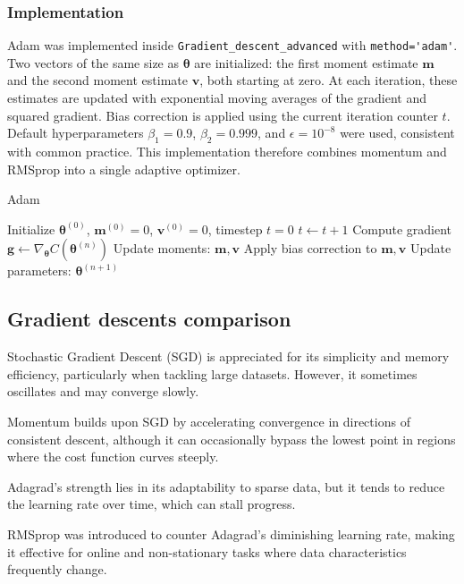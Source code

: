 \documentclass[
 reprint,            %
 amsmath,amssymb,
 aps,
]{revtex4-2}
\begin{document}
\subsubsection{Implementation}

Adam was implemented inside \verb|Gradient_descent_advanced| with \verb|method='adam'|. Two vectors of the same size as $\boldsymbol{\theta}$ are initialized: the first moment estimate $\mathbf{m}$ and the second moment estimate $\mathbf{v}$, both starting at zero. At each iteration, these estimates are updated with exponential moving averages of the gradient and squared gradient. Bias correction is applied using the current iteration counter $t$.
Default hyperparameters $\beta_1=0.9$, $\beta_2=0.999$, and $\epsilon=10^{-8}$ were used, consistent with common practice. This implementation therefore combines momentum and RMSprop into a single adaptive optimizer.
\begin{algorithm}[H]
\caption{Adam}
\begin{algorithmic}[1]
\State Initialize $\boldsymbol{\theta}^{(0)}$, $\mathbf{m}^{(0)}=0$, $\mathbf{v}^{(0)}=0$, timestep $t=0$
\State $t \gets t+1$
\State Compute gradient $\mathbf{g} \gets \nabla_{\boldsymbol{\theta}} C(\boldsymbol{\theta}^{(n)})$
\State Update moments: $\mathbf{m}, \mathbf{v}$
\State Apply bias correction to $\mathbf{m}, \mathbf{v}$
\State Update parameters: $\boldsymbol{\theta}^{(n+1)}$
\EndFor
\end{algorithmic}
\end{algorithm}

\subsection{Gradient descents comparison}
Stochastic Gradient Descent (SGD) is appreciated for its simplicity and memory efficiency, particularly when tackling large datasets. However, it sometimes oscillates and may converge slowly. 

Momentum builds upon SGD by accelerating convergence in directions of consistent descent, although it can occasionally bypass the lowest point in regions where the cost function curves steeply. 

Adagrad's strength lies in its adaptability to sparse data, but it tends to reduce the learning rate over time, which can stall progress. 

RMSprop was introduced to counter Adagrad's diminishing learning rate, making it effective for online and non-stationary tasks where data characteristics frequently change. 
\end{document}

